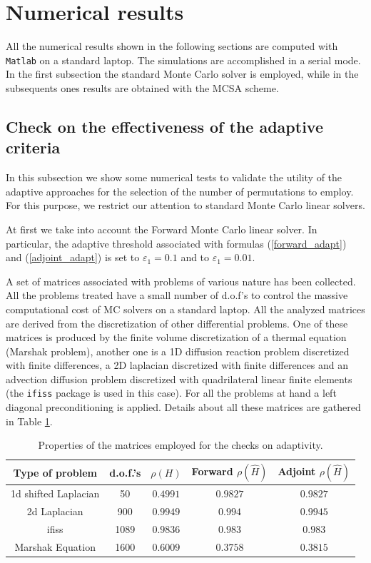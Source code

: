 \documentclass[a4paper,10pt]{article}
\begin{document}
\section{Numerical results}

All the numerical results shown in the following sections are computed with 
\texttt{Matlab} on a standard laptop. The simulations are accomplished in a 
serial mode.
In the 
first subsection the standard Monte Carlo solver is employed, while in the 
subsequents ones results are obtained with the MCSA scheme.


\subsection{Check on the effectiveness of the adaptive criteria}
In this subsection we show some numerical tests to validate the utility of the 
adaptive approaches for the selection of the number of permutations to employ. 
For this purpose, we restrict our attention to standard Monte Carlo linear 
solvers.

At first we take into account the Forward Monte Carlo linear solver.
In particular, the adaptive threshold associated with formulas 
(\ref{forward_adapt}) and 
(\ref{adjoint_adapt}) is set to $\varepsilon_1=0.1$ and to 
$\varepsilon_1=0.01$. \newline

A set of matrices associated with problems of various nature has been collected.
All the problems treated have a small number of d.o.f's to control the 
massive computational cost of MC solvers on a standard laptop. All the analyzed 
matrices are derived from the 
discretization of other differential problems.
One of these matrices is produced by the finite volume discretization of 
a thermal equation (Marshak problem), another one is a 1D diffusion reaction 
problem discretized with finite differences, a 
2D laplacian discretized with finite differences and an advection 
diffusion 
problem discretized with quadrilateral linear finite elements (the 
\texttt{ifiss} package is used in this case). 
For all the problems at hand a left diagonal preconditioning is applied. 
Details about all these matrices are gathered in Table 
\ref{table_data}.

\begin{table}[!h]
\centering
\begin{tabular}{|c|c|c|c|c|}
\hline
\textbf{Type of problem} & \textbf{d.o.f.'s} &
$\rho(H)$&Forward $\rho(\hat{H})$&Adjoint $\rho(\hat{H})$\\
\hline
1d shifted Laplacian & 50 & $0.4991$ & $0.9827$ & $0.9827$\\ 
\hline
2d Laplacian & 900 & $0.9949$ & $0.994$ & $0.9945$\\
\hline
ifiss & 1089 &$0.9836$ & $0.983$ & $0.983$ \\
\hline
Marshak Equation & 1600 & $0.6009$ & $0.3758$ & $ 0.3815$ \\
\hline
\end{tabular}
\caption{Properties of the matrices employed for the checks on adaptivity.} 
\label{table_data}
\end{table}
\end{document}
